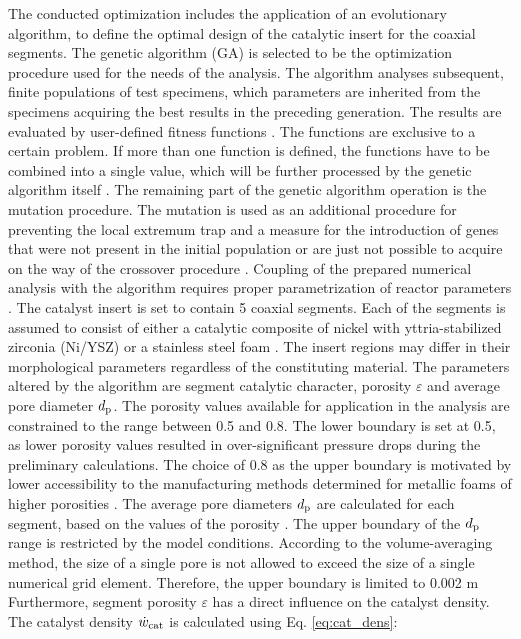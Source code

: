 \documentclass[preprint,12pt]{elsarticle}
\begin{document}
The conducted optimization includes the application of an evolutionary algorithm, to define the optimal design of the catalytic insert for the coaxial segments. The genetic algorithm (GA) is selected to be the optimization procedure used for the needs of the analysis. The algorithm analyses subsequent, finite populations of test specimens, which parameters are inherited from the specimens acquiring the best results in the preceding generation. The results are evaluated by user-defined fitness functions \cite{Tai2022}. The functions are exclusive to a certain problem. If more than one function is defined, the functions have to be combined into a single value, which will be further processed by the genetic algorithm itself \cite{Goldberg1989}. The remaining part of the genetic algorithm operation is the mutation procedure. The mutation is used as an additional procedure for preventing the local extremum trap and a measure for the introduction of genes that were not present in the initial population or are just not possible to acquire on the way of the crossover procedure \cite{Raja2017}. Coupling of the prepared numerical analysis with the algorithm requires proper parametrization of reactor parameters \cite{Goldberg1989}. The catalyst insert is set to contain 5  coaxial segments. Each of the segments is assumed to consist of either a catalytic composite of nickel with yttria-stabilized zirconia (Ni/YSZ) or a stainless steel foam \cite{Pajak2021IJHEa}. The insert regions may differ in their morphological parameters regardless of the constituting material. The parameters altered by the algorithm are segment catalytic character, porosity $\varepsilon$ and average pore diameter $d_{\rm{p}}$. The porosity values available for application in the analysis are constrained to the range between 0.5 and 0.8. The lower boundary is set at 0.5, as lower porosity values resulted in over-significant pressure drops during the preliminary calculations.  The choice of 0.8 as the upper boundary is motivated by lower accessibility to the manufacturing methods determined for metallic foams of higher porosities \cite{Banhart2001}.  The average pore diameters $d_{\rm{p}}$ are calculated for each segment, based on the values of the porosity \cite{Pajak2021IJHEa}. The upper boundary of the $d_{\rm{p}}$ range is restricted by the model conditions. According to the volume-averaging method, the size of a single pore is not allowed to exceed the size of a single numerical grid element. Therefore, the upper boundary is limited to 0.002 m \cite{Carbonell1984} Furthermore, segment porosity $\varepsilon$ has a direct influence on the catalyst density. The catalyst density $\dot{w}_{\rm{cat}}$ is calculated using Eq. \eqref{eq:cat_dens}:
\end{document}
